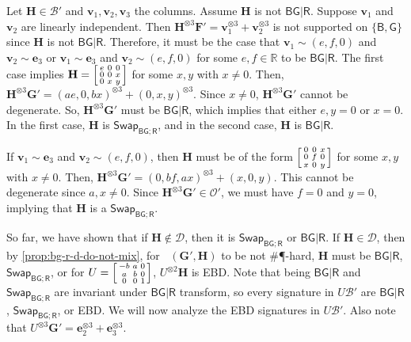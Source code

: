 \documentclass[11pt]{article}
\DeclareMathOperator{\holts}{Holant^*_3}
\newcommand{\db}{\mathsf{B}}
\newcommand{\dg}{\mathsf{G}}
\newcommand{\dr}{\mathsf{R}}
\newcommand{\swhelper}[1]{$\mathsf{Swap}_{#1}$\xspace}
\newcommand{\swbg}{\swhelper{\db \dg; \dr}}
\newcommand{\sph}{\#\P-hard\xspace}
\newcommand{\teh}{^{\otimes 3}}
\newcommand{\tew}{^{\otimes 2}}
\newcommand{\strspt}{\textsf{EBD}\xspace}
\begin{document}
\begin{enumerate}
Let $\mathbf{H} \in \mathcal{B}'$ and $\mathbf{v}_1, \mathbf{v}_2, \mathbf{v}_3$ the columns.
    Assume $\mathbf{H}$ is not $\db \dg | \dr$.
    Suppose $\mathbf{v}_1$ and $\mathbf{v}_2$ are linearly independent.
    Then $\mathbf{H}\teh \mathbf{F}' = \mathbf{v}_1\teh + \mathbf{v}_2\teh$ is not supported on $\{\db, \dg\}$ since $\mathbf{H}$ is not $\db \dg | \dr$.
    Therefore, it must be the case that $\mathbf{v}_1 \sim (e, f, 0)$ and $\mathbf{v}_2 \sim \mathbf{e}_3$ or $\mathbf{v}_1\sim \mathbf{e}_3$ and $\mathbf{v}_2 \sim (e, f, 0)$ for some $e, f \in \mathbb{R}$ to be $\db \dg | \dr$.
    The first case implies $\mathbf{H} = \begin{bsmallmatrix}
      e & 0 & 0 \\
      0 & 0 & x \\
      0 & x & y
    \end{bsmallmatrix}$ for some $x, y$ with $x \ne 0$.
Then, $\mathbf{H}\teh \mathbf{G}' = (ae, 0, bx)\teh + (0, x, y)\teh$.
    Since $x \ne 0$, $\mathbf{H}\teh \mathbf{G}'$ cannot be degenerate.
    So,  $\mathbf{H}\teh \mathbf{G}'$ must be $\db \dg | \dr$, which implies that either $e, y = 0$ or $x = 0$.
    In the first case, $\mathbf{H}$ is \swbg, and in the second case, $\mathbf{H}$ is $\db \dg | \dr$.

    If $\mathbf{v}_1 \sim \mathbf{e}_3$ and $\mathbf{v}_2 \sim (e, f, 0)$, then $\mathbf{H}$ must be of the form
    $\begin{bsmallmatrix}
      0 & 0 & x \\
      0 & f & 0 \\
      x & 0 & y
    \end{bsmallmatrix}$ for some $x, y$ with $x \ne 0$.
    Then, $\mathbf{H}\teh \mathbf{G}' = (0, bf, ax)\teh + (x, 0, y)$.
    This cannot be degenerate since $a, x \ne 0$.
    Since $\mathbf{H}\teh \mathbf{G}' \in \mathcal{O}'$, we must have $f = 0$ and $y = 0$, implying that $\mathbf{H}$ is a \swbg.

    So far, we have shown that if $\mathbf{H} \notin \mathcal{D}$, then it is \swbg or $\db \dg | \dr$.
    If $\mathbf{H} \in \mathcal{D}$, then
    by \cref{prop:bg-r-d-do-not-mix}, for $\holts(\mathbf{G}', \mathbf{H})$ to be not \sph, $\mathbf{H}$ must be $\db \dg | \dr$, \swbg, or for $U = \begin{bsmallmatrix}
      -b & a & 0 \\
      a & b & 0 \\
      0 & 0 & 1
    \end{bsmallmatrix}$, $U \tew \mathbf{H}$ is \strspt.
    Note that being $\db \dg | \dr$ and \swbg are invariant under $\db \dg | \dr$ transform, 
    so every signature in $U \mathcal{B}'$ are $\db \dg | \dr$, \swbg, or \strspt.
    We will now analyze
    the \strspt signatures in $U \mathcal{B}'$.
    Also note that $U\teh \mathbf{G}' = \mathbf{e}_2\teh + \mathbf{e}_3\teh$.


\end{enumerate}
\end{document}
